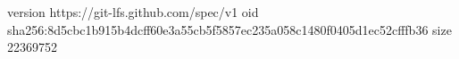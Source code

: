 version https://git-lfs.github.com/spec/v1
oid sha256:8d5cbc1b915b4dcff60e3a55cb5f5857ec235a058c1480f0405d1ec52cfffb36
size 22369752
